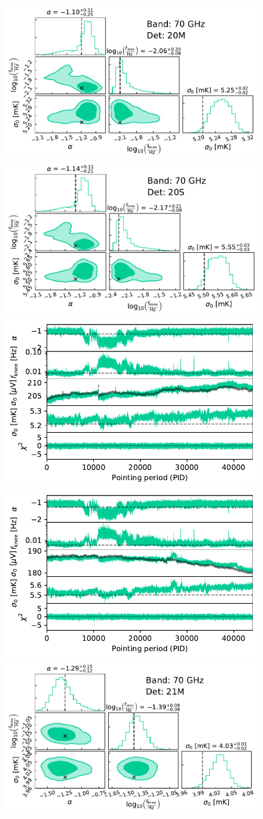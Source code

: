 \documentclass{aa}
\begin{document}
\begin{figure}[p]
        \begin{center}
                \includegraphics[width=0.495\linewidth]{figs/corner_band_070_det_5_mean_new.pdf}
                \includegraphics[width=0.495\linewidth]{figs/corner_band_070_det_6_mean_new.pdf}\\
                \includegraphics[width=0.495\linewidth]{figs/xi_vs_pid_band_070_det_5_mean_new.pdf}
                \includegraphics[width=0.495\linewidth]{figs/xi_vs_pid_band_070_det_6_mean_new.pdf}\\
                \vspace*{0.5mm}
                \includegraphics[width=0.495\linewidth]{figs/corner_band_070_det_7_mean_new.pdf}

\end{center}
\end{figure}
\end{document}

